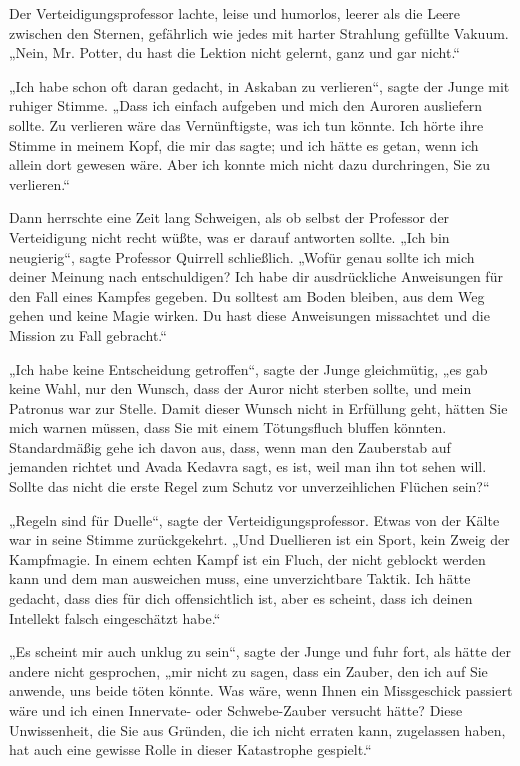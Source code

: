 {Der Verteidigungsprofessor lachte, leise und humorlos, leerer als die Leere zwischen den Sternen, gefährlich wie jedes mit harter Strahlung gefüllte Vakuum. „Nein, Mr. Potter, du hast die Lektion nicht gelernt, ganz und gar nicht.“

„Ich habe schon oft daran gedacht, in Askaban zu verlieren“, sagte der Junge mit ruhiger Stimme. „Dass ich einfach aufgeben und mich den Auroren ausliefern sollte. Zu verlieren wäre das Vernünftigste, was ich tun könnte. Ich hörte ihre Stimme in meinem Kopf, die mir das sagte; und ich hätte es getan, wenn ich allein dort gewesen wäre. Aber ich konnte mich nicht dazu durchringen, Sie zu verlieren.“

Dann herrschte eine Zeit lang Schweigen, als ob selbst der Professor der Verteidigung nicht recht wüßte, was er darauf antworten sollte. „Ich bin neugierig“, sagte Professor Quirrell schließlich. „Wofür genau sollte ich mich deiner Meinung nach entschuldigen? Ich habe dir ausdrückliche Anweisungen für den Fall eines Kampfes gegeben. Du solltest am Boden bleiben, aus dem Weg gehen und keine Magie wirken. Du hast diese Anweisungen missachtet und die Mission zu Fall gebracht.“

„Ich habe keine Entscheidung getroffen“, sagte der Junge gleichmütig, „es gab keine Wahl, nur den Wunsch, dass der Auror nicht sterben sollte, und mein Patronus war zur Stelle. Damit dieser Wunsch nicht in Erfüllung geht, hätten Sie mich warnen müssen, dass Sie mit einem Tötungsfluch bluffen könnten. Standardmäßig gehe ich davon aus, dass, wenn man den Zauberstab auf jemanden richtet und Avada Kedavra sagt, es ist, weil man ihn tot sehen will. Sollte das nicht die erste Regel zum Schutz vor unverzeihlichen Flüchen sein?“

„Regeln sind für Duelle“, sagte der Verteidigungsprofessor. Etwas von der Kälte war in seine Stimme zurückgekehrt. „Und Duellieren ist ein Sport, kein Zweig der Kampfmagie. In einem echten Kampf ist ein Fluch, der nicht geblockt werden kann und dem man ausweichen muss, eine unverzichtbare Taktik. Ich hätte gedacht, dass dies für dich offensichtlich ist, aber es scheint, dass ich deinen Intellekt falsch eingeschätzt habe.“

„Es scheint mir auch unklug zu sein“, sagte der Junge und fuhr fort, als hätte der andere nicht gesprochen, „mir nicht zu sagen, dass ein Zauber, den ich auf Sie anwende, uns beide töten könnte. Was wäre, wenn Ihnen ein Missgeschick passiert wäre und ich einen Innervate- oder Schwebe-Zauber versucht hätte? Diese Unwissenheit, die Sie aus Gründen, die ich nicht erraten kann, zugelassen haben, hat auch eine gewisse Rolle in dieser Katastrophe gespielt.“

}
